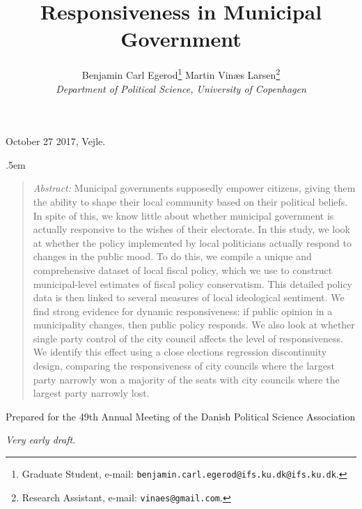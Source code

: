 \documentclass[a4paper,12pt]{article}
\title{\bigskip \bigskip \sffamily \LARGE Responsiveness in Municipal Government}
\author{\bigskip Benjamin Carl Egerod\footnote{Graduate Student, e-mail: \texttt{benjamin.carl.egerod@ifs.ku.dk@ifs.ku.dk}.} \qquad Martin Vinæs Larsen\footnote{Research Assistant, e-mail: \texttt{vinaes@gmail.com}.} \\ \textit{Department of Political Science, University of Copenhagen}} %
\makeatletter
\renewcommand{\maketitle}{
	\begin{flushleft}
		
		\onehalfspacing
		
		\@title
		
		\lineskip .5em
		\normalfont{\normalsize{\@author}}
\end{flushleft}}
\makeatother
\begin{document}
	
	
	
	
	\begin{footnotesize} \noindent October 27 2017, Vejle. \end{footnotesize} %
	
	\vspace{0.7in}
	
	\maketitle
	
	\bigskip
	
	\begin{quotation} %

		\small \noindent \emph{Abstract:} Municipal governments supposedly empower citizens, giving them the ability to shape their local community based on their political beliefs. In spite of this, we know little about whether municipal government is actually responsive to the wishes of their electorate. In this study, we look at whether the policy implemented by local politicians actually respond to changes in the public mood. To do this, we compile a unique and comprehensive dataset of local fiscal policy, which we use to construct municipal-level estimates of fiscal policy conservatism. This detailed policy data is then linked to several measures of local ideological sentiment. We find strong evidence for dynamic responsiveness: if public opinion in a municipality changes, then public policy responds. We also look at whether single party control of the city council affects the level of responsiveness. We identify this effect using a close elections regression discontinuity design, comparing the responsiveness of city councils where the largest party narrowly won a majority of the seats with city councils where the largest party narrowly lost.
	\end{quotation}

\bigskip

\bigskip

\bigskip
	
	
	\noindent Prepared for the 49th Annual Meeting of the Danish Political Science Association \newline 
	
	\thispagestyle{empty} %
	
	
	\bigskip
	
		\noindent \textit{Very early draft.}
	
	\bigskip
	
\end{document}
